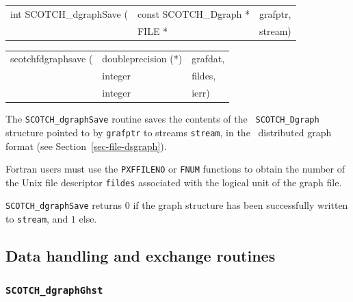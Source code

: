 \begin{itemize}
\progsyn

{\tt\begin{tabular}{l@{}ll}
int SCOTCH\_dgraphSave ( & const SCOTCH\_Dgraph * & grafptr, \\
                         & FILE *                 & stream)
\end{tabular}}

{\tt\begin{tabular}{l@{}ll}
scotchfdgraphsave ( & doubleprecision (*) & grafdat, \\
                    & integer             & fildes, \\
                    & integer             & ierr)
\end{tabular}}

\progdes

The {\tt SCOTCH\_dgraphSave} routine saves the contents of the {\tt
SCOTCH\_\lbt Dgraph} structure pointed to by {\tt grafptr} to streams
{\tt stream}, in the \scotch\ distributed graph format (see
Section~\ref{sec-file-dsgraph}).

Fortran users must use the {\tt PXFFILENO} or {\tt FNUM} functions to
obtain the number of the Unix file descriptor {\tt fildes} associated
with the logical unit of the graph file.

\progret

{\tt SCOTCH\_dgraphSave} returns $0$ if the graph structure has been
successfully written to {\tt stream}, and $1$ else.
\end{itemize}

\subsection{Data handling and exchange routines}

\subsubsection{{\tt SCOTCH\_dgraphGhst}}
\label{sec-lib-func-dgraphghst}

